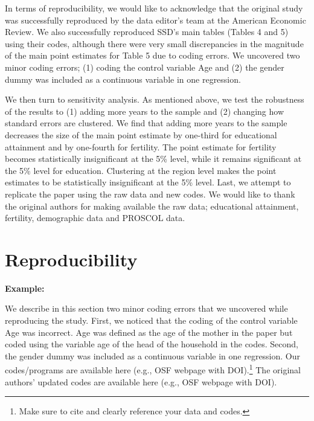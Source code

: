 \documentclass[12pt,a4paper]{article}
\begin{document}
In terms of reproducibility, we would like to acknowledge that the original study was successfully reproduced by the data editor’s team at the American Economic Review. We also successfully reproduced SSD’s main tables (Tables 4 and 5) using their codes, although there were very small discrepancies in the magnitude of the main point estimates for Table 5 due to coding errors. We uncovered two minor coding errors; (1) coding the control variable Age and (2) the gender dummy was included as a continuous variable in one regression.

We then turn to sensitivity analysis. As mentioned above, we test the robustness of the results to (1) adding more years to the sample and (2) changing how standard errors are clustered. We find that adding more years to the sample decreases the size of the main point estimate by one-third for educational attainment and by one-fourth for fertility. The point estimate for fertility becomes statistically insignificant at the 5\% level, while it remains significant at the 5\% level for education. Clustering at the region level makes the point estimates to be statistically insignificant at the 5\% level.
Last, we attempt to replicate the paper using the raw data and new codes. We would like to thank the original authors for making available the raw data; educational attainment, fertility, demographic data and PROSCOL data.


\section{Reproducibility}





\textbf{Example:} 

We describe in this section two minor coding errors that we uncovered while reproducing the study. First, we noticed that the coding of the control variable Age was incorrect. Age was defined as the age of the mother in the paper but coded using the variable age of the head of the household in the codes. Second, the gender dummy was included as a continuous variable in one regression. Our codes/programs are available here (e.g., OSF webpage with DOI).\footnote{Make sure to cite and clearly reference your data and codes.} The original authors’ updated codes are available here (e.g., OSF webpage with DOI).
\end{document}
